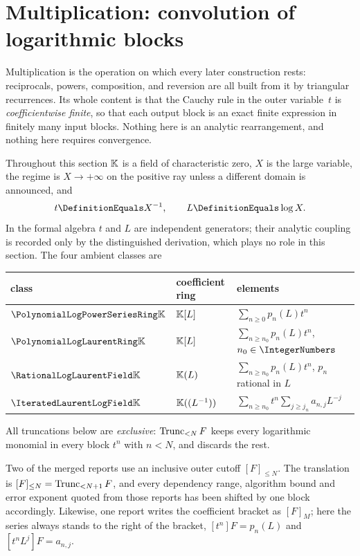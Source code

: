 \section{Multiplication: convolution of logarithmic blocks}
\label{plt:sec:multiplication}

Multiplication is the operation on which every later construction rests:
reciprocals, powers, composition, and reversion are all built from it by
triangular recurrences.  Its whole content is that the Cauchy rule in the
outer variable~$t$ is \emph{coefficientwise finite}, so that each output
block is an exact finite expression in finitely many input blocks.  Nothing
here is an analytic rearrangement, and nothing here requires convergence.

Throughout this section $\K$ is a field of characteristic zero, $X$ is the
large variable, the regime is $X\to+\infty$ on the positive ray unless a
different domain is announced, and
\begin{equation}\label{plt:eq:mul-generators}
 t\DefinitionEquals X^{-1},
 \qquad
 L\DefinitionEquals\log X .
\end{equation}
In the formal algebra $t$ and $L$ are independent generators; their analytic
coupling is recorded only by the distinguished derivation, which plays no
role in this section.  The four ambient classes are

\begin{center}
\begin{tabular}{@{}lll@{}}
\hline
class & coefficient ring & elements \\
\hline
$\PLpow$ & $\K[L]$ & $\sum_{n\ge0}p_n(L)t^n$ \\
$\PLlau$ & $\K[L]$ & $\sum_{n\ge n_0}p_n(L)t^n$, $n_0\in\IntegerNumbers$ \\
$\PLrat$ & $\K(L)$ & $\sum_{n\ge n_0}p_n(L)t^n$, $p_n$ rational in $L$ \\
$\PLit$  & $\K((L^{-1}))$ & $\sum_{n\ge n_0}t^n\sum_{j\ge j_n}a_{n,j}L^{-j}$ \\
\hline
\end{tabular}
\end{center}

All truncations below are \emph{exclusive}: $\Trunc{F}{N}$ keeps every
logarithmic monomial in every block $t^n$ with $n<N$, and discards the rest.

\begin{remark}
\label{plt:rmk:mul-conventions}
Two of the merged reports use an inclusive outer cutoff $[F]_{\le N}$.  The
translation is $[F]_{\le N}=\Trunc{F}{N+1}$, and every dependency range,
algorithm bound and error exponent quoted from those reports has been shifted
by one block accordingly.  Likewise, one report writes the coefficient
bracket as $[F]_M$; here the series always stands to the right of the
bracket, $[t^n]F=p_n(L)$ and $[t^nL^j]F=a_{n,j}$.
\end{remark}

